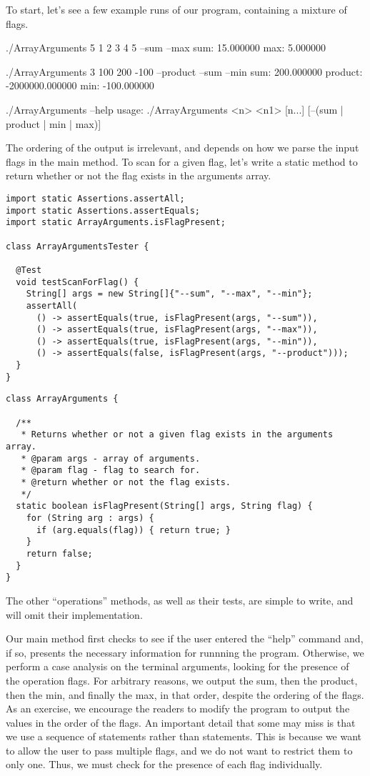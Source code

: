 To start, let's see a few example runs of our program, containing a mixture of flags.

\begin{verbnobox}[\small]
./ArrayArguments 5 1 2 3 4 5 --sum --max
sum: 15.000000
max: 5.000000

./ArrayArguments 3 100 200 -100 --product --sum --min
sum: 200.000000
product: -2000000.000000
min: -100.000000

./ArrayArguments --help
usage: ./ArrayArguments <n> <n1> [n...] [--(sum | product | min | max)]
\end{verbnobox}

The ordering of the output is irrelevant, and depends on how we parse the input flags in the main method. To scan for a given flag, let's write a static method to return whether or not the flag exists in the arguments array.

\begin{lstlisting}[language=MyJava]
import static Assertions.assertAll;
import static Assertions.assertEquals;
import static ArrayArguments.isFlagPresent;

class ArrayArgumentsTester {

  @Test
  void testScanForFlag() {
    String[] args = new String[]{"--sum", "--max", "--min"};
    assertAll(
      () -> assertEquals(true, isFlagPresent(args, "--sum")),
      () -> assertEquals(true, isFlagPresent(args, "--max")),
      () -> assertEquals(true, isFlagPresent(args, "--min")),
      () -> assertEquals(false, isFlagPresent(args, "--product")));
  }
}
\end{lstlisting}

\begin{lstlisting}[language=MyJava]
class ArrayArguments {

  /**
   * Returns whether or not a given flag exists in the arguments array.
   * @param args - array of arguments.
   * @param flag - flag to search for.
   * @return whether or not the flag exists.
   */
  static boolean isFlagPresent(String[] args, String flag) {
    for (String arg : args) {
      if (arg.equals(flag)) { return true; }
    }
    return false;
  }
}
\end{lstlisting}

The other ``operations'' methods, as well as their tests, are simple to write, and will omit their implementation. 

Our main method first checks to see if the user entered the ``help'' command and, if so, presents the necessary information for runnning the program. Otherwise, we perform a case analysis on the terminal arguments, looking for the presence of the operation flags. For arbitrary reasons, we output the sum, then the product, then the min, and finally the max, in that order, despite the ordering of the flags. As an exercise, we encourage the readers to modify the program to output the values in the order of the flags. An important detail that some may miss is that we use a sequence of  statements rather than  statements. This is because we want to allow the user to pass multiple flags, and we do not want to restrict them to only one. Thus, we must check for the presence of each flag individually.

